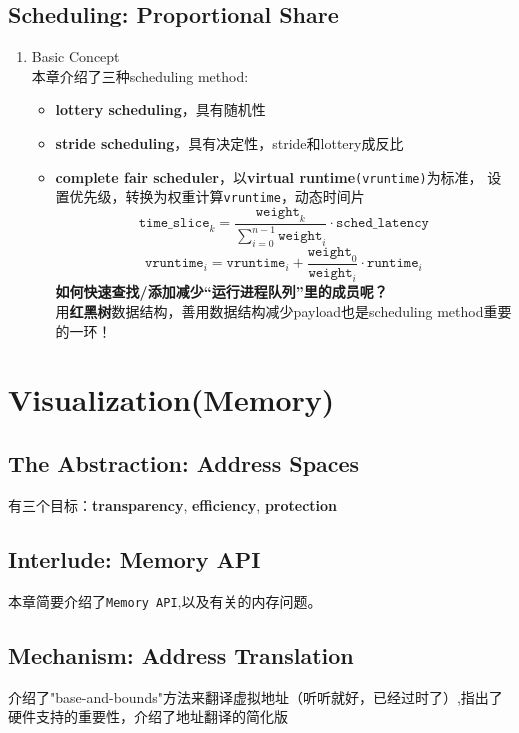 \documentclass{article}
\begin{document}
\subsection{Scheduling: Proportional Share}
\begin{enumerate}
    \item Basic Concept \\
    本章介绍了三种scheduling method: 
    \begin{itemize}
    \item \textbf{lottery scheduling}，具有随机性
    \item \textbf{stride scheduling}，具有决定性，stride和lottery成反比
    \item \textbf{complete fair scheduler}，以\textbf{virtual runtime}\texttt{(vruntime)}为标准，
    设置优先级，转换为权重计算\texttt{vruntime}，动态时间片
    \begin{equation*}
        \texttt{time\_slice}_{k} = \frac{\texttt{weight}_{k}}{\sum_{i=0}^{n-1} \texttt{weight}_{i}} \cdot \texttt{sched\_latency}
    \end{equation*}
    \begin{equation*}
        \texttt{vruntime}_{i} = \texttt{vruntime}_{i} + \frac{\texttt{weight}_{0}}{\texttt{weight}_{i}} \cdot \texttt{runtime}_{i}
    \end{equation*}
    \textbf{如何快速查找/添加减少“运行进程队列”里的成员呢？} \\
    用\textbf{红黑树}数据结构，善用数据结构减少payload也是scheduling method重要的一环！
    \end{itemize}
\end{enumerate}

\section{Visualization(Memory)}
\subsection{The Abstraction: Address Spaces} 
有三个目标：\textbf{transparency}, \textbf{efficiency}, \textbf{protection}
\subsection{Interlude: Memory API}
本章简要介绍了\texttt{Memory API},以及有关的内存问题。
\subsection{Mechanism: Address Translation}
介绍了"base-and-bounds"方法来翻译虚拟地址（听听就好，已经过时了）,指出了硬件支持的重要性，介绍了地址翻译的简化版
\end{document}
